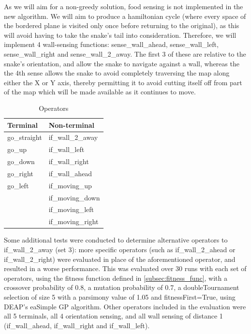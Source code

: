 \documentclass[british,10pt,a4paper]{article}
\begin{document}
As we will aim for a non-greedy solution, food sensing is not implemented in the new algorithm. We will aim to produce a hamiltonian cycle (where every space of the bordered plane is visited only once before returning to the original), as this will avoid having to take the snake's tail into consideration. Therefore, we will implement 4 wall-sensing functions: sense\_wall\_ahead, sense\_wall\_left, sense\_wall\_right and sense\_wall\_2\_away. The first 3 of these are relative to the snake's orientation, and allow the snake to navigate against a wall, whereas the the 4th sense allows the snake to avoid completely traversing the map along either the X or Y axis, thereby permitting it to avoid cutting itself off from part of the map which will be made available as it continues to move. \newline

\begin{table}
	\centering
	\begin{tabular}{|l|l|}
		\hline
		\textbf{Terminal} & \textbf{Non-terminal} \\ \hline
		go\_straight      & if\_wall\_2\_away     \\ \hline
		go\_up            & if\_wall\_left        \\ \hline
		go\_down          & if\_wall\_right       \\ \hline
		go\_right         & if\_wall\_ahead       \\ \hline
		go\_left          & if\_moving\_up        \\ \hline
		                  & if\_moving\_down      \\ \hline
		                  & if\_moving\_left      \\ \hline
		                  & if\_moving\_right     \\ \hline
	\end{tabular}
	\caption{Operators}
	\label{tab:operators}
\end{table}

Some additional tests were conducted to determine alternative operators to if\_wall\_2\_away (set 3): more specific operators (such as if\_wall\_2\_ahead or if\_wall\_2\_right) were evaluated in place of the aforementioned operator, and resulted in a worse performance. This was evaluated over 30 runs with each set of operators, using the fitness function defined in \autoref{subsec:fitness_func}, with a crossover probability of 0.8, a mutation probability of 0.7, a doubleTournament selection of size 5 with a parsimony value of 1.05 and fitnessFirst=True, using DEAP's eaSimple GP algorithm. Other operators included in the evaluation were all 5 terminals, all 4 orientation sensing, and all wall sensing of distance 1 (if\_wall\_ahead, if\_wall\_right and if\_wall\_left). \newline
\end{document}
